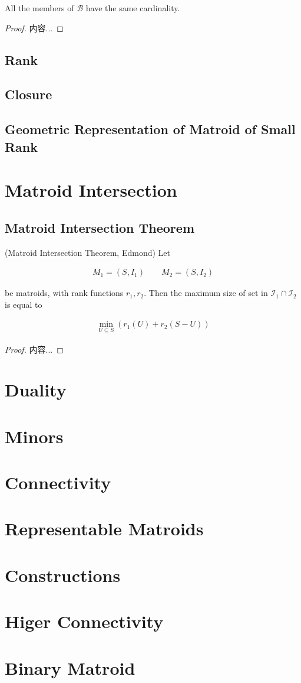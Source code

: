 \documentclass[Total.tex]{subfiles}
\begin{document}
			\begin{lemma}
				All the members of $\mathcal{B}$ have the same cardinality.
			\end{lemma}
			
			\begin{proof}
				内容...
			\end{proof}
		\section{Rank}
		\section{Closure}
		\section{Geometric Representation of Matroid of Small Rank}
		
	\chapter{Matroid Intersection}
	
		\section{Matroid Intersection Theorem}
			
			\begin{theorem}
				(Matroid Intersection Theorem, Edmond) Let 
				
				\begin{gather*}
					M_1=(S,I_1)\qquad M_2=(S,I_2)
				\end{gather*}
				
				be matroids, with rank functions $r_1,r_2$. Then the maximum size of set in $\mathcal{I}_1\cap \mathcal{I}_2$ is equal to 
				
				\begin{gather*}
					\min_{U\subseteq S} (r_1(U)+r_2(S-U))
				\end{gather*}
			\end{theorem}
			
			\begin{proof}
				内容...
			\end{proof}
	\chapter{Duality}
	\chapter{Minors}
	\chapter{Connectivity}
	\chapter{Representable Matroids}
	\chapter{Constructions}
	\chapter{Higer Connectivity}
	\chapter{Binary Matroid}
\end{document}
